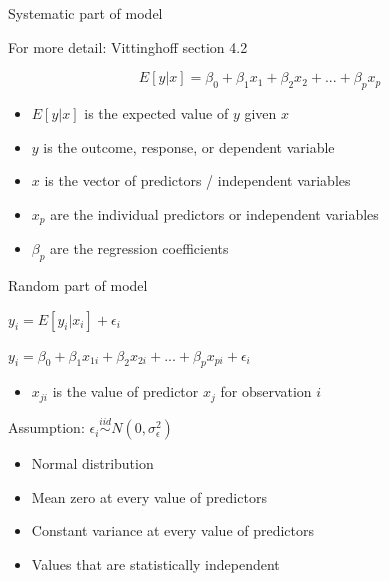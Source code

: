 \documentclass[
  ignorenonframetext,
]{beamer}
\providecommand{\tightlist}{%
  \setlength{\itemsep}{0pt}\setlength{\parskip}{0pt}}
\begin{document}
\begin{frame}{Systematic part of model}
\protect\hypertarget{systematic-part-of-model}{}

For more detail: Vittinghoff section 4.2

\[
E[y|x] = \beta_0 + \beta_1 x_1 + \beta_2 x_2 + ... + \beta_p x_p
\]

\begin{itemize}
\tightlist
\item
  \(E[y|x]\) is the expected value of \(y\) given \(x\)
\item
  \(y\) is the outcome, response, or dependent variable
\item
  \(x\) is the vector of predictors / independent variables
\item
  \(x_p\) are the individual predictors or independent variables
\item
  \(\beta_p\) are the regression coefficients
\end{itemize}

\end{frame}

\begin{frame}{Random part of model}
\protect\hypertarget{random-part-of-model}{}

\(y_i = E[y_i|x_i] + \epsilon_i\)

\(y_i = \beta_0 + \beta_1 x_{1i} + \beta_2 x_{2i} + ... + \beta_p x_{pi} + \epsilon_i\)

\begin{itemize}
\tightlist
\item
  \(x_{ji}\) is the value of predictor \(x_j\) for observation \(i\)
\end{itemize}

Assumption: \(\epsilon_i \stackrel{iid}{\sim} N(0, \sigma_\epsilon^2)\)

\begin{itemize}
\tightlist
\item
  Normal distribution
\item
  Mean zero at every value of predictors
\item
  Constant variance at every value of predictors
\item
  Values that are statistically independent
\end{itemize}

\end{frame}
\end{document}
